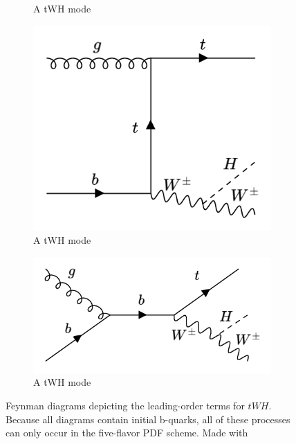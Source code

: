 \begin{figure}[htp]
\begin{subfigure}[b]{0.3\textwidth}
         \caption{A tWH mode}
         \label{fig:tWH3}
     \end{subfigure}
     \hfill
         \begin{subfigure}[b]{0.3\textwidth}
         \centering
         \includegraphics[width=\textwidth]{figures/theory_chapter/tWH4.png}
         \caption{A tWH mode}
         \label{fig:tWH4}
     \end{subfigure}
     \hfill
         \begin{subfigure}[b]{0.3\textwidth}
         \centering
         \includegraphics[width=\textwidth]{figures/theory_chapter/tWH5.png}
         \caption{A tWH mode}
         \label{fig:tWH5}
     \end{subfigure}
  \label{fig:tWHmodes}
  \caption{Feynman diagrams depicting the leading-order terms for $tWH$. Because all diagrams contain initial b-quarks, all of these processes can only occur in the five-flavor PDF scheme. Made with \cite{FeynmanMaker}}  
\end{figure}

